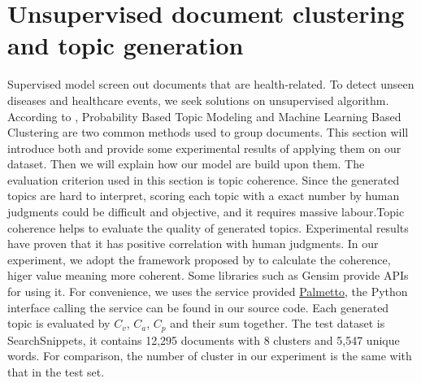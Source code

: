\section{Unsupervised document clustering and topic generation}
\label{sec:unsupervised}
Supervised model screen out documents that are health-related. To detect unseen diseases and healthcare events, we seek solutions on unsupervised algorithm. According to \cite{allahyari2017brief}, Probability Based Topic Modeling and Machine Learning Based Clustering are two common methods used to group documents. This section will introduce both and provide some experimental results of applying them on our dataset. Then we will explain how our model are build upon them. The evaluation criterion used in this section is topic coherence. Since the generated topics are hard to interpret, scoring each topic with a exact number by human judgments could be difficult and objective, and it requires massive labour.Topic coherence helps to evaluate the quality of generated topics. Experimental results have proven that it has positive correlation with human judgments. In our experiment, we adopt the framework proposed by \cite{roder2015exploring} to calculate the coherence, higer value meaning more coherent. Some libraries such as Gensim provide APIs for using it. For convenience, we uses the service provided \href{https://palmetto.demos.dice-research.org/}{Palmetto}, the Python interface calling the service can be found in our source code. Each generated topic is evaluated by $C_v$, $C_a$, $C_p$ and their sum together. The test dataset is SearchSnippets, it contains 12,295 documents with 8 clusters and 5,547 unique words. For comparison, the number of cluster in our experiment is the same with that in the test set. 

